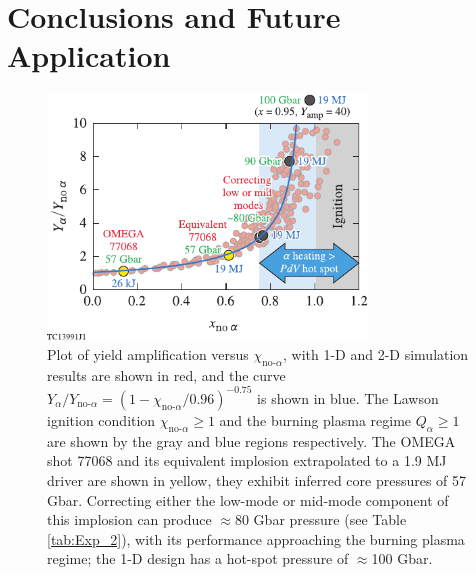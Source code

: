 \documentclass[aip,reprint]{revtex4-1}
\begin{document}
\section{Conclusions and Future Application}
\label{sec:Exp_summary}
%
%
\begin{figure}
\includegraphics[width=85mm]{Fig16_Bose}
\caption{\label{Fig3} Plot of yield amplification versus $\chi_{\text{no-}\alpha}$,\cite{Betti-alphaheat} with 1-D and 2-D simulation results are shown in red, and the curve $Y_\alpha/Y_{\text{no-}\alpha} = (1-\chi_{\text{no-}\alpha}/0.96)^{-0.75}$ is shown in blue. The Lawson ignition condition $\chi_{\text{no-}\alpha}\geq 1$ and the burning plasma regime $Q_\alpha \geq 1$ are shown by the gray and blue regions respectively. The OMEGA shot 77068 and its equivalent implosion extrapolated to a 1.9 MJ driver are shown in yellow, they exhibit inferred core pressures of 57 Gbar. Correcting either the low-mode or mid-mode component of this implosion can produce $\approx 80$ Gbar pressure (see Table \ref{tab:Exp_2}), with its performance approaching the burning plasma regime; the 1-D design has a hot-spot pressure of $\approx$100 Gbar.}
\end{figure}
%
\end{document}
